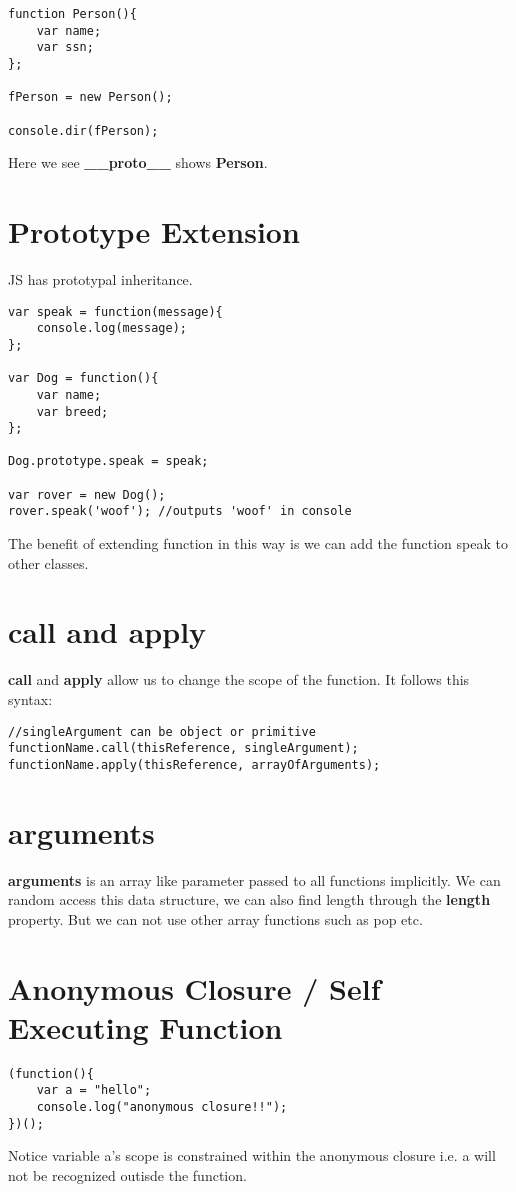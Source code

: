 \documentclass[12pt, a4paper]{article}
\begin{document}
\begin{verbatim}
function Person(){
    var name;
    var ssn;    
};

fPerson = new Person();

console.dir(fPerson);
\end{verbatim}
Here we see \textbf{\_\_proto\_\_} shows \textbf{Person}.

\section{Prototype Extension}
JS has prototypal inheritance.
\begin{verbatim}
var speak = function(message){
    console.log(message);
};

var Dog = function(){
    var name;
    var breed;
};

Dog.prototype.speak = speak;

var rover = new Dog();
rover.speak('woof'); //outputs 'woof' in console
\end{verbatim}
The benefit of extending function in this way is we can add the function speak to other classes.

\section{call and apply}
\textbf{call} and \textbf{apply} allow us to change the scope of the function. It follows this syntax:
\begin{verbatim}
//singleArgument can be object or primitive
functionName.call(thisReference, singleArgument); 
functionName.apply(thisReference, arrayOfArguments);
\end{verbatim}

\section{arguments}
\textbf{arguments} is an array like parameter passed to all functions implicitly.
We can random access this data structure, we can also find length through the \textbf{length} property.
But we can not use other array functions such as pop etc.

\section{Anonymous Closure / Self Executing Function}
\begin{verbatim}
(function(){
    var a = "hello";
    console.log("anonymous closure!!");
})();
\end{verbatim}
Notice variable a's scope is constrained within the anonymous closure
i.e. a will not be recognized outisde the function.
\end{document}
